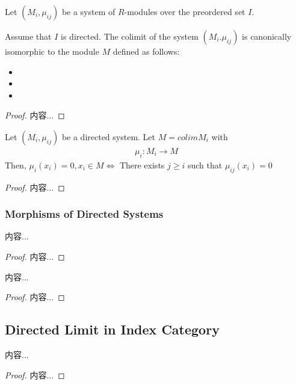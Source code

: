 \documentclass[Total.tex]{subfiles}
\begin{document}
			\begin{lemma}
				Let $(M_i,\mu_{ij})$ be a system of $R$-modules over the preordered set $I$.
				
				Assume that $I$ is directed. The colimit of the system $(M_i.\mu_{ij})$ is canonically isomorphic to the module $M$ defined as follows:
				\begin{itemize}
					\item 
					\item 
					\item 
				\end{itemize}
			\end{lemma}
			\begin{proof}
				内容...
			\end{proof}
			
			\begin{lemma}
				Let $(M_i,\mu_{ij})$ be a directed system. Let $M=colim M_i$ with
				\begin{gather*}
					\mu_i:M_i\rightarrow M
				\end{gather*}
				Then, $\mu_i(x_i)=0,x_i\in M\Leftrightarrow $ There exists $j\geq i$ such that $\mu_{ij}(x_i)=0$
			\end{lemma}
			\begin{proof}
				内容...
			\end{proof}
			\subsubsection{Morphisms of Directed Systems}
			\begin{lemma}
				内容...
			\end{lemma}
			\begin{proof}
				内容...
			\end{proof}
			
			\begin{lemma}
				内容...
			\end{lemma}
			\begin{proof}
				内容...
			\end{proof}
			\subsection{Directed Limit in Index Category}
			
			\begin{proposition}
				内容...
			\end{proposition}
			\begin{proof}
				内容...
			\end{proof}
\end{document}
